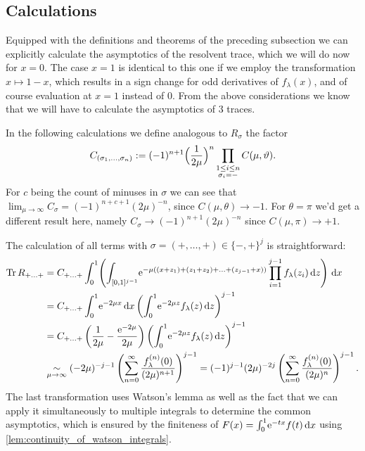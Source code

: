 \subsection{Calculations}
Equipped with the definitions and theorems of the preceding subsection we can
explicitly calculate the asymptotics of the resolvent trace, which we will do
now for $x=0$. The case $x=1$ is identical to this one if we employ the
transformation $x\mapsto 1-x$, which results in a sign change for odd
derivatives of $f_\lambda(x)$, and of course evaluation at $x=1$ instead of $0$.
From the above considerations we know that we will have to calculate the
asymptotics of $3$ traces.

In the following calculations we define analogous to $R_\sigma$ the factor
\begin{equation}
  C_{(\sigma_1,\ldots,\sigma_n)} := (-1)^{n+1}\Bigl(\frac{1}{2\mu}\Bigr)^n
  \prod_{ \substack{ 1\le i \le n \\ \sigma_i = - }} C(\mu,\theta).
\end{equation}
For $c$ being the count of minuses in $\sigma$ we can see that
$\lim_{\mu\to\infty} C_\sigma = (-1)^{n+c+1} (2\mu)^{-n}$, since $C(\mu,\theta)
\to -1$. For $\theta = \pi$ we'd get a different result here, namely $C_\sigma
\to (-1)^{n+1}(2\mu)^{-n}$ since $C(\mu,\pi)\to +1$.

The calculation of all terms with $\sigma=(+,\ldots,+)\in\{-,+\}^j$ is
straightforward:
\begin{equation}
  \label{frm:r-plusplus}
  \begin{split}
    \Tr R_{+\ldots+} &=
    C_{+\ldots+}
    \Int{x}{\left(
      \Integ{[0,1]^{j-1}}{z}{
        \Eto{-\mu((x + z_1) + (z_1 + z_2) + \ldots + (z_{j-1} + x))}
        \prod_{i=1}^{j-1} f_\lambda(z_i)
      }\right)
    } \\
    &= C_{+\ldots+}
    \Int{x}{\Eto{-2\mu x}} \left(\Int{z}{\Eto{-2\mu
    z}f_\lambda(z)}\right)^{j-1} \\
    &= C_{+\ldots+}
    \left(\frac1{2\mu} - \frac{\Eto{-2\mu}}{2\mu}\right)
    \left(\Int{z}{\Eto{-2\mu z}f_\lambda(z)}\right)^{j-1} \\
    &\SimMu (-2\mu)^{-j-1}
    \left(\Wsum{f_\lambda^{(n)}}\right)^{j-1} = (-1)^{j-1} (2\mu)^{-2j}
    \left(\sum_{n=0}^\infty\frac{f_\lambda^{(n)}(0)}{(2\mu)^n}\right)^{j-1}.
  \end{split}
\end{equation}
The last transformation uses Watson's lemma as well as the fact that we can
apply it simultaneously to multiple integrals to determine the common
asymptotics, which is ensured by the finiteness of $F(x) =
\Int{x}{\Eto{-tx}f(t)}$ using \cref{lem:continuity_of_watson_integrals}.

